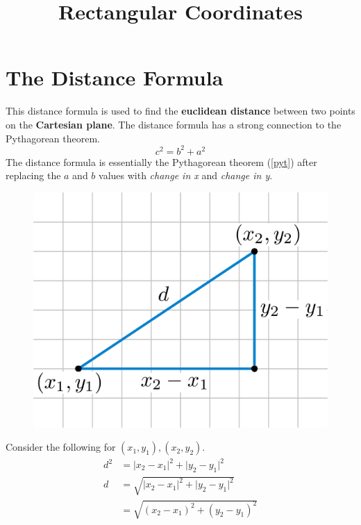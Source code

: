 \documentclass{article}
\title{Rectangular Coordinates}
\author{}
\date{}
\newcommand{\bd}{\textbf}
\begin{document}
	
	\maketitle{}
	
		\section{The Distance Formula}
			This distance formula is used to find the \bd{euclidean distance} between two points on the \bd{Cartesian plane}. The distance formula has a strong connection to the Pythagorean theorem.
			\begin{equation}\label{pyt}
				c^2 = b^2 + a^2
			\end{equation}
			The distance formula is essentially the Pythagorean theorem (\ref{pyt}) after replacing the $a$ and $b$ values with \emph{change in x} and \emph{change in y}.
			
			\begin{figure}
				\includegraphics[scale=0.14]{Distance_Formula.jpg}
			\end{figure}
			Consider the following for $(x_1, y_1), (x_2, y_2)$.
			\begin{align}
				d^2 & = \lvert x_2 - x_1 \rvert ^2 + \lvert y_2 - y_1 \rvert ^2 \\
			      d & = \sqrt{\lvert x_2 - x_1 \rvert ^2 + \lvert y_2 - y_1 \rvert ^2} \\
			      	& = \sqrt{(x_2 - x_1)^2 + (y_2 - y_1)^2} \label{df}
			\end{align}
		
\end{document}
